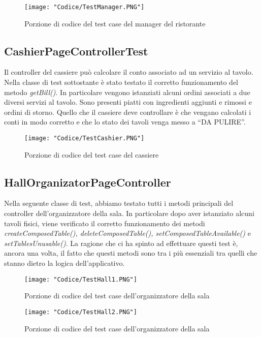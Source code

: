 \documentclass{article}
\begin{document}
\begin{figure}[!h]
\centering
\texttt{[image: "Codice/TestManager.PNG"]}
\caption{Porzione di codice del test case del manager del ristorante}
\end{figure}

\subsection{CashierPageControllerTest}

Il controller del cassiere pu\`o calcolare il conto associato ad un servizio al tavolo. Nella classe di test sottostante è stato testato il corretto funzionamento del metodo \textit{getBill()}. In particolare vengono istanziati alcuni ordini associati a due diversi servizi al tavolo. Sono presenti piatti con ingredienti aggiunti e rimossi e ordini di storno. Quello che il cassiere deve controllare \`e che vengano calcolati i conti in modo corretto e che lo stato dei tavoli venga messo a ``DA PULIRE''.

\begin{figure}[!h]
\centering
\texttt{[image: "Codice/TestCashier.PNG"]}
\caption{Porzione di codice del test case del cassiere}
\end{figure}

\newpage

\subsection{HallOrganizatorPageController}

Nella seguente classe di test, abbiamo testato tutti i metodi principali del controller dell’organizzatore della sala. In particolare dopo aver istanziato alcuni tavoli fisici, viene verificato il corretto funzionamento dei metodi \textit{createComposedTable(), deleteComposedTable(), setComposedTableAvailable()} e \textit{setTablesUnusable()}. La ragione che ci ha spinto ad effettuare questi test \`e, ancora una volta, il fatto che questi metodi sono tra i pi\`u essenziali tra quelli che stanno dietro la logica dell’applicativo.

\begin{figure}[!h]
\centering
\texttt{[image: "Codice/TestHall1.PNG"]}
\caption{Porzione di codice del test case dell'organizzatore della sala}
\end{figure}

\begin{figure}[!h]
\centering
\texttt{[image: "Codice/TestHall2.PNG"]}
\caption{Porzione di codice del test case dell'organizzatore della sala}
\end{figure}
\end{document}
